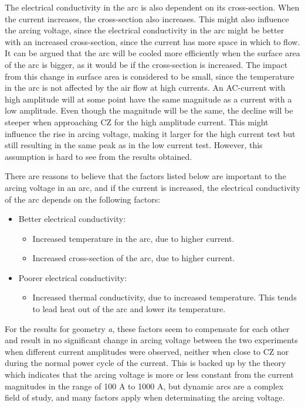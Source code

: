\documentclass[10pt,a4paper,twoside]{article}
\begin{document}
The electrical conductivity in the arc is also dependent on its cross-section. When the current increases, the cross-section also increases. This might also influence the arcing voltage, since the electrical conductivity in the arc might be better with an increased cross-section, since the current has more space in which to flow. It can be argued that the arc will be cooled more efficiently when the surface area of the arc is bigger, as it would be if the cross-section is increased. The impact from this change in surface area is considered to be small, since the temperature in the arc is not affected by the air flow at high currents. An AC-current with high amplitude will at some point have the same magnitude as a current with a low amplitude. Even though the magnitude will be the same, the decline will be steeper when approaching CZ for the high amplitude current. This might influence the rise in arcing voltage, making it larger for the high current test but still resulting in the same peak as in the low current test. However, this assumption is hard to see from the results obtained.

There are reasons to believe that the factors listed below are important to the arcing voltage in an arc, and if the current is increased, the electrical conductivity of the arc depends on the following factors:
\begin{itemize}
\item[] Better electrical conductivity:
	\begin{itemize}
		\item Increased temperature in the arc, due to higher current.
		\item Increased cross-section of the arc, due to higher current.
	\end{itemize}
\item[] Poorer electrical conductivity:
	\begin{itemize}
		\item Increased thermal conductivity, due to increased temperature. This tends to lead heat out of the arc and lower its temperature.
	\end{itemize}		 
\end{itemize} 

For the results for geometry \textit{a}, these factors seem to compensate for each other and result in no significant change in arcing voltage between the two experiments when different current amplitudes were observed, neither when close to CZ nor during the normal power cycle of the current. This is backed up by the theory which indicates that the arcing voltage is more or less constant from the current magnitudes in the range of 100 A to 1000 A, but dynamic arcs are a complex field of study, and many factors apply when determinating the arcing voltage.
\end{document}
